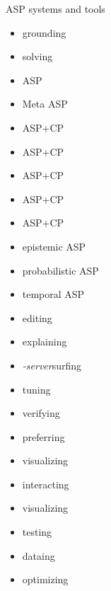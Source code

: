 \providecommand{\purpose}[1]{\hfill #1}
\begin{frame}[c]{ASP systems and tools}
  \begin{minipage}[t]{0.45\linewidth}
    \begin{itemize}
    \item<1> \gringo\purpose{grounding}
    \item<1> \clasp\purpose{solving}
    \item<1> \clingo\purpose{ASP}
    \item<1> \metasp\purpose{Meta ASP}
    \item<1> \clingcon\purpose{ASP+CP}
    \item<1> \flingo\purpose{ASP+CP}
    \item<1> \clingodl\purpose{ASP+CP}
    \item<1> \clingolp\purpose{ASP+CP}
    \item<1> \clingolpx\purpose{ASP+CP}
    \item<1> \eclingo\purpose{epistemic ASP}
    \item<1> \plingo\purpose{probabilistic ASP}
    \item<1> \telingo\purpose{temporal ASP}
    \end{itemize}
  \end{minipage}
  \pause
  \begin{minipage}[t]{0.4\linewidth}
    \begin{itemize}
    \item<2> \clinsight\purpose{editing}
    \item<2> \xclingo\purpose{explaining}
    \item<2> \clingo\textit{-server}\purpose{surfing}
    \item<2> \acclingo\purpose{tuning}
    \item<2> \anthem\purpose{verifying}
    \item<2> \asprin\purpose{preferring}
    \item<2> \clingraph\purpose{visualizing}
    \item<2> \clinguin\purpose{interacting}
    \item<2> \viasp\purpose{visualizing}
    \item<2> \clintest\purpose{testing}
    \item<2> \clorm\purpose{dataing}
    \item<2> \ngo\purpose{optimizing}
  \end{itemize}
\end{minipage}
\end{frame}
%
